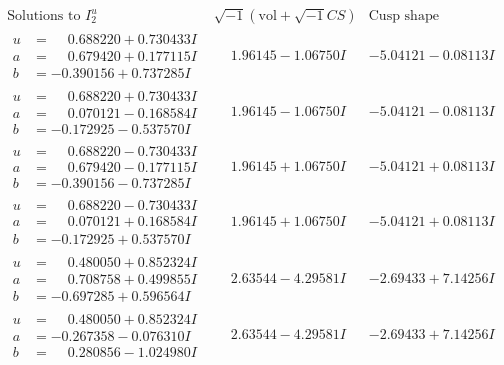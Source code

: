 \documentclass[1p]{elsarticle_modified}
\theoremstyle{definition}
\newcommand{\I}{\sqrt{-1}}
\begin{document}
$$\begin{array}{c|c|c}  
\text{Solutions to }I^u_{2}& \I (\text{vol} + \sqrt{-1}CS) & \text{Cusp shape}\\
 \hline 
\begin{aligned}
u &= \phantom{-}0.688220 + 0.730433 I \\
a &= \phantom{-}0.679420 + 0.177115 I \\
b &= -0.390156 + 0.737285 I\end{aligned}
 & \phantom{-}1.96145 - 1.06750 I & -5.04121 - 0.08113 I \\ \hline\begin{aligned}
u &= \phantom{-}0.688220 + 0.730433 I \\
a &= \phantom{-}0.070121 - 0.168584 I \\
b &= -0.172925 - 0.537570 I\end{aligned}
 & \phantom{-}1.96145 - 1.06750 I & -5.04121 - 0.08113 I \\ \hline\begin{aligned}
u &= \phantom{-}0.688220 - 0.730433 I \\
a &= \phantom{-}0.679420 - 0.177115 I \\
b &= -0.390156 - 0.737285 I\end{aligned}
 & \phantom{-}1.96145 + 1.06750 I & -5.04121 + 0.08113 I \\ \hline\begin{aligned}
u &= \phantom{-}0.688220 - 0.730433 I \\
a &= \phantom{-}0.070121 + 0.168584 I \\
b &= -0.172925 + 0.537570 I\end{aligned}
 & \phantom{-}1.96145 + 1.06750 I & -5.04121 + 0.08113 I \\ \hline\begin{aligned}
u &= \phantom{-}0.480050 + 0.852324 I \\
a &= \phantom{-}0.708758 + 0.499855 I \\
b &= -0.697285 + 0.596564 I\end{aligned}
 & \phantom{-}2.63544 - 4.29581 I & -2.69433 + 7.14256 I \\ \hline\begin{aligned}
u &= \phantom{-}0.480050 + 0.852324 I \\
a &= -0.267358 - 0.076310 I \\
b &= \phantom{-}0.280856 - 1.024980 I\end{aligned}
 & \phantom{-}2.63544 - 4.29581 I & -2.69433 + 7.14256 I \\ \hline\begin{aligned}

\end{aligned}
\end{array}$$
\end{document}
